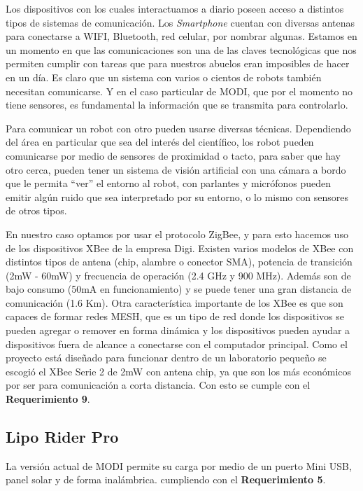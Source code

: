 Los dispositivos con los cuales interactuamos a diario poseen acceso a distintos tipos de sistemas de comunicación. Los \textit{Smartphone} cuentan con diversas antenas para conectarse a WIFI, Bluetooth, red celular,  por nombrar algunas. Estamos en un momento en que las comunicaciones son una de las claves tecnológicas que nos permiten cumplir con tareas que para nuestros abuelos eran imposibles de hacer en un día. Es claro que un sistema con varios o cientos de robots también necesitan comunicarse. Y en el caso particular de MODI, que por el momento no tiene sensores, es fundamental la información que se transmita para controlarlo. 

Para comunicar un robot con otro pueden usarse diversas técnicas. Dependiendo del área en particular que sea del interés del científico, los robot pueden comunicarse por medio de sensores de proximidad o tacto, para saber que hay otro cerca, pueden tener un sistema de visión artificial con una cámara a bordo que le permita “ver” el entorno al robot, con parlantes y micrófonos pueden emitir algún ruido que sea interpretado por su entorno, o lo mismo con sensores de otros tipos.

En nuestro caso optamos por usar el protocolo ZigBee, y para esto hacemos uso de los dispositivos XBee de la empresa Digi. Existen varios modelos de XBee con distintos tipos de antena (chip, alambre o conector SMA), potencia de transición (2mW - 60mW) y frecuencia de operación (2.4 GHz y 900 MHz). Además son de bajo consumo (50mA en funcionamiento) y se puede tener una gran distancia de comunicación (1.6 Km). Otra característica importante de los XBee es que son capaces de formar redes MESH, que es un tipo de red donde los dispositivos se pueden agregar o remover en forma dinámica y los dispositivos pueden ayudar a dispositivos fuera de alcance a  conectarse con el computador principal. Como el proyecto está diseñado para funcionar dentro de un laboratorio pequeño se escogió el XBee Serie 2 de 2mW con antena chip, ya que son los más económicos por ser para comunicación a corta distancia. Con esto se cumple con el \textbf{Requerimiento 9}.

\subsection{Lipo Rider Pro}
 La versión actual de MODI permite su carga por medio de un puerto Mini USB, panel solar y de forma inalámbrica. cumpliendo con el \textbf{Requerimiento 5}.

